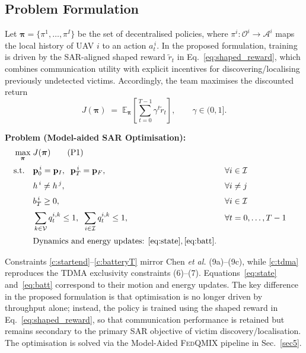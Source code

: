 \documentclass[drones,article,accept,pdftex,moreauthors]{Definitions/mdpi}
\begin{document}
\subsection{Problem Formulation}\label{sec:opt-goal}

Let $\boldsymbol{\pi}=\{\pi^{1},\dots,\pi^{I}\}$ be the set of decentralised policies, where
$\pi^{i}:\mathcal{O}^i\!\rightarrow\!\mathcal{A}^i$ maps the local history of UAV $i$ to an
action $a_t^{\,i}$. In the proposed formulation, training is driven by the SAR-aligned
shaped reward $\tilde r_t$ in Eq.~\eqref{eq:shaped_reward}, which combines communication
utility with explicit incentives for discovering/localising previously undetected victims.
Accordingly, the team maximises the discounted return
\begin{equation}
J(\boldsymbol{\pi}) \;=\;
\mathbb{E}_{\boldsymbol{\pi}}\!\left[\sum_{t=0}^{T-1}\gamma^{t} \tilde r_t\right],
\qquad \gamma\in(0,1].
\label{eq:return}
\end{equation}

\medskip
\noindent\textbf{Problem (Model-aided SAR Optimisation):}
\begin{align}
\max_{\boldsymbol{\pi}}\;& J(\boldsymbol{\pi})
\tag{P1}\label{prob:P1}\\[2pt]
\text{s.t.}\quad
& \mathbf{p}_{0}^{\,i}=\mathbf{p}_{I},\;\; \mathbf{p}_{T}^{\,i}=\mathbf{p}_{F}, && \forall i\in\mathcal{I} \label{c:startend}\\[2pt]
& h^{\,i}\neq h^{\,j}, && \forall i\neq j \label{c:altineq}\\[2pt]
& b_{T}^{\,i}\ge 0, && \forall i\in\mathcal{I} \label{c:batteryT}\\[2pt]
& \sum_{k\in\mathcal{V}} q_t^{i,k}\le 1,\;\;
  \sum_{i\in\mathcal{I}} q_t^{i,k}\le 1, && \forall t=0,\dots,T-1 \label{c:tdma}\\[2pt]
& \text{Dynamics and energy updates: } \eqref{eq:state},\eqref{eq:batt}. \nonumber
\end{align}

\noindent
Constraints \eqref{c:startend}--\eqref{c:batteryT} mirror Chen \emph{et al.} (9a)--(9c),
while \eqref{c:tdma} reproduces the TDMA exclusivity constraints (6)--(7).
Equations~\eqref{eq:state} and~\eqref{eq:batt} correspond to their motion and energy
updates. The key difference in the proposed formulation is that optimisation is no longer
driven by throughput alone; instead, the policy is trained using the shaped reward in
Eq.~\eqref{eq:shaped_reward}, so that communication performance is retained but remains
secondary to the primary SAR objective of victim discovery/localisation. The optimisation
is solved via the Model-Aided \textsc{FedQMIX} pipeline in Sec.~\ref{sec5}.
\end{document}
